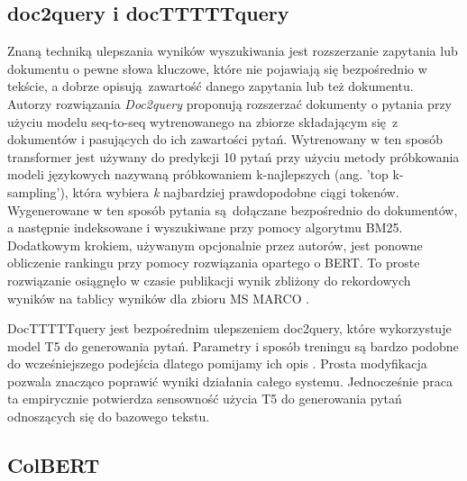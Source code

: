 \subsection{doc2query i docTTTTTquery}

Znaną techniką ulepszania wyników wyszukiwania jest rozszerzanie zapytania lub dokumentu o pewne słowa kluczowe, które nie pojawiają się bezpośrednio w tekście, a dobrze opisują zawartość danego zapytania lub też dokumentu. Autorzy rozwiązania \emph{Doc2query} proponują rozszerzać dokumenty o pytania przy użyciu modelu seq-to-seq wytrenowanego na zbiorze składającym się z dokumentów i pasujących do ich zawartości pytań. Wytrenowany w ten sposób transformer jest używany do predykcji 10 pytań przy użyciu metody próbkowania modeli językowych nazywaną próbkowaniem k-najlepszych (ang. 'top k-sampling'), która wybiera \emph{k} najbardziej prawdopodobne ciągi tokenów. Wygenerowane w ten sposób pytania są dołączane bezpośrednio do dokumentów, a następnie indeksowane i wyszukiwane przy pomocy algorytmu BM25. Dodatkowym krokiem, używanym opcjonalnie przez autorów, jest ponowne obliczenie rankingu przy pomocy rozwiązania opartego o BERT. To proste rozwiązanie osiągnęło w czasie publikacji wynik zbliżony do rekordowych wyników na tablicy wyników dla zbioru MS MARCO \autocite{nogueira2019document}. \newline

DocTTTTTquery jest bezpośrednim ulepszeniem doc2query, które wykorzystuje model T5 do generowania pytań. Parametry i sposób treningu są bardzo podobne do wcześniejszego podejścia dlatego pomijamy ich opis \autocite{nogueira2019doc2query}. Prosta modyfikacja pozwala znacząco poprawić wyniki działania całego systemu. Jednocześnie praca ta empirycznie potwierdza sensowność użycia T5 do generowania pytań odnoszących się do bazowego tekstu.  


\subsection{ColBERT}

